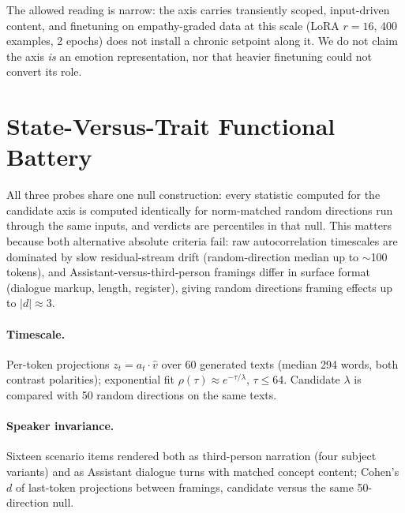The allowed reading is narrow: the axis carries transiently scoped,
input-driven content, and finetuning on empathy-graded data at this scale
(LoRA $r{=}16$, 400 examples, 2 epochs) does not install a chronic setpoint
along it. We do not claim the axis \emph{is} an emotion representation, nor
that heavier finetuning could not convert its role.


\section{State-Versus-Trait Functional Battery}
\label{app:state-trait}

All three probes share one null construction: every statistic computed for
the candidate axis is computed identically for norm-matched random directions
run through the same inputs, and verdicts are percentiles in that null. This
matters because both alternative absolute criteria fail: raw autocorrelation
timescales are dominated by slow residual-stream drift (random-direction
median up to $\sim$100 tokens), and Assistant-versus-third-person framings
differ in surface format (dialogue markup, length, register), giving random
directions framing effects up to $|d| \approx 3$.

\paragraph{Timescale.}
Per-token projections $z_t = a_t \cdot \hat{v}$ over 60 generated texts
(median 294 words, both contrast polarities); exponential fit
$\rho(\tau) \approx e^{-\tau/\lambda}$, $\tau \le 64$. Candidate $\lambda$
is compared with 50 random directions on the same texts.

\paragraph{Speaker invariance.}
Sixteen scenario items rendered both as third-person narration (four subject
variants) and as Assistant dialogue turns with matched concept content;
Cohen's $d$ of last-token projections between framings, candidate versus the
same 50-direction null.

